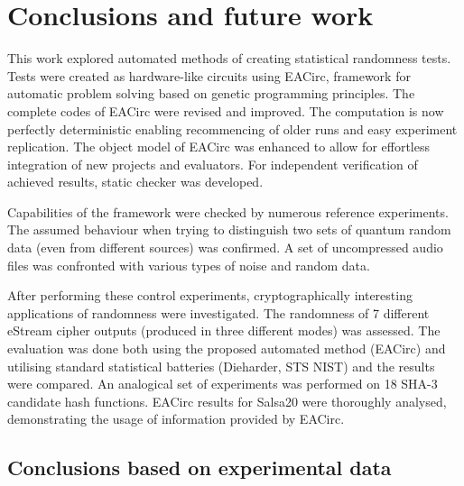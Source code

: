 \documentclass[12pt,oneside]{fithesis2}
\begin{document}
\chapter{Conclusions and future work}
\label{chap:conclusions}

This work explored automated methods of creating statistical randomness tests. Tests were created as hardware-like circuits using
EACirc, framework for automatic problem solving based on genetic programming principles. The complete codes of EACirc were revised
and improved. The computation is now perfectly deterministic enabling recommencing of older runs and easy experiment replication.
The object model of EACirc was enhanced to allow for effortless integration of new projects and evaluators.
For independent verification of achieved results, static checker was developed.

Capabilities of the framework were checked by numerous reference experiments. The assumed behaviour when trying to distinguish
two sets of quantum random data (even from different sources) was confirmed. A set of uncompressed audio files was confronted with
various types of noise and random data. 

After performing these control experiments, cryptographically interesting applications of randomness were investigated.
The randomness of 7 different eStream cipher outputs (produced in three different modes) was assessed.
The evaluation was done both using the proposed automated method (EACirc) and utilising standard statistical batteries
(Dieharder, STS NIST) and the results were compared. An analogical set of experiments was performed 
on 18 SHA-3 candidate hash functions.
EACirc results for Salsa20 were thoroughly analysed, demonstrating the usage of information provided by EACirc.

\section{Conclusions based on experimental data}
\label{sec:outro-conclusions}
\end{document}
